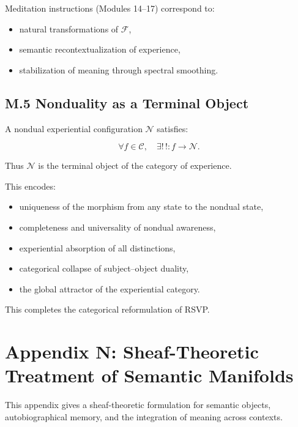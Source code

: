 \documentclass[12pt]{article}
\begin{document}
Meditation instructions (Modules 14–17) correspond to:

\begin{itemize}
    \item natural transformations of $\mathcal{F}$,
    \item semantic recontextualization of experience,
    \item stabilization of meaning through spectral smoothing.
\end{itemize}

\subsection*{M.5 Nonduality as a Terminal Object}

A nondual experiential configuration $\mathcal{N}$ satisfies:

\[
\forall f \in \mathcal{C}, \quad \exists !\,! : f \to \mathcal{N}.
\]

Thus $\mathcal{N}$ is the terminal object of the category of experience.

This encodes:

\begin{itemize}
    \item uniqueness of the morphism from any state to the nondual state,
    \item completeness and universality of nondual awareness,
    \item experiential absorption of all distinctions,
    \item categorical collapse of subject–object duality,
    \item the global attractor of the experiential category.
\end{itemize}

This completes the categorical reformulation of RSVP.


\section*{Appendix N: Sheaf-Theoretic Treatment of Semantic Manifolds}

This appendix gives a sheaf-theoretic formulation for semantic objects,
autobiographical memory, and the integration of meaning across contexts.
\end{document}

